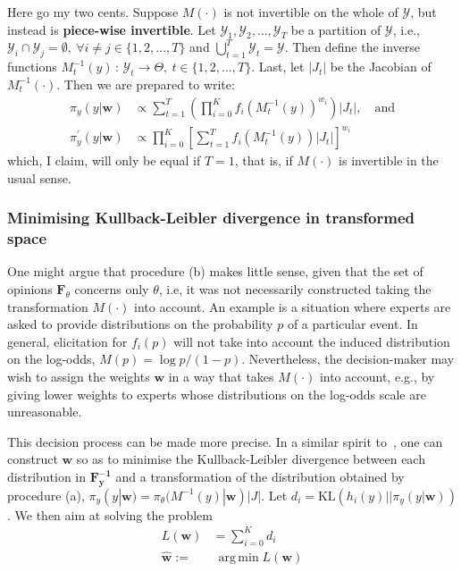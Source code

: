 \documentclass[11pt]{article}
\DeclareMathOperator*{\argmin}{arg\,min}
\begin{document}
Here go my two cents.
Suppose $M(\cdot)$ is not invertible on the whole of $\mathcal{Y}$, but instead is \textbf{piece-wise invertible}.
Let $\mathcal{Y}_1, \mathcal{Y}_2, \ldots, \mathcal{Y}_T$ be a  partition of $\mathcal{Y}$, i.e., $\mathcal{Y}_i\cap\mathcal{Y}_j = \emptyset,\: \forall i\neq j \in \{1, 2, \ldots, T\}$ and $\bigcup_{t = 1}^T\mathcal{Y}_t = \mathcal{Y}$.
Then define the inverse functions $M_{t}^{-1}(y)\,:\, \mathcal{Y}_t \to \Theta, \: t \in \{1, 2, \ldots, T\}$.
Last, let $|J_t|$ be the Jacobian of $M_{t}^{-1}(\cdot)$.
Then we are prepared to write:
\begin{align}
\label{eq:piecewiseTransf}
\pi_{y}(y |\mathbf{w}) &\propto \sum_{t = 1}^T\left(\prod_{i=0}^K f_i(M_t^{-1}(y))^{w_i}\right)|J_t|, \quad \text{and}\\
\pi^{\prime}_{y}(y|\mathbf{w}) &\propto \prod_{i=0}^K\left[\sum_{t = 1}^T f_i(M_t^{-1}(y))|J_t|\right]^{w_i}
\end{align}
which, I claim, will only be equal if $T = 1$, that is,  if $M(\cdot)$ is invertible in the usual sense.


\subsubsection{Minimising Kullback-Leibler divergence in transformed space}

One might argue that procedure (b) makes little sense, given that the set of opinions $\mathbf{F}_{\theta}$ concerns only $\theta$, i.e, it was not necessarily constructed taking the transformation $M(\cdot)$ into account.
An example is a situation where experts are asked to provide distributions on the probability $p$ of a particular event.
In general, elicitation for $f_i(p)$ will not take into account the induced distribution on the log-odds, $M(p) = \log p/(1-p)$.
Nevertheless, the decision-maker may wish to assign the weights $\mathbf{w}$ in a way that takes $M(\cdot)$ into account, e.g., by giving lower weights to experts whose distributions on the log-odds scale are unreasonable.

This decision process can be made more precise.
In a similar spirit to~\citep{carvalho2016}, one can construct $\mathbf{w}$ so as to minimise the Kullback-Leibler divergence between each distribution in $\mathbf{F^{-1}_y}$ and a transformation of the distribution obtained by procedure (a), $\pi_{y}(y | \mathbf{w}) = \pi_{\theta}( M^{-1}(y)| \mathbf{w})|J|$.
Let $d_i = \text{KL}( h_i(y) || \pi_{y}(y | \mathbf{w}))$.
We then aim at solving the problem
\begin{align}
L(\mathbf{w}) &= \sum_{i=0}^Kd_i \\
     \hat{\mathbf{w}}:=& \:\argmin L(\mathbf{w})  \nonumber
\end{align}
\end{document}

